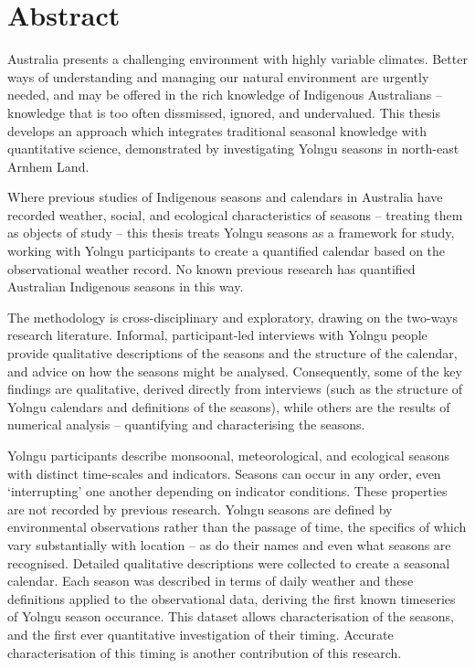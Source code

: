 \chapter{Abstract}

Australia presents a challenging environment with highly variable climates.
Better ways of understanding and managing our natural environment are urgently needed, and
may be offered in the rich knowledge of Indigenous Australians -- knowledge that
is too often dissmissed, ignored, and undervalued.
%
This thesis develops an approach which integrates traditional seasonal knowledge
with quantitative science, demonstrated by investigating Yolngu
seasons in north-east Arnhem Land.

Where previous studies of Indigenous seasons and calendars in Australia have
recorded weather, social, and ecological characteristics of seasons -- treating
them as objects of study -- this thesis treats Yolngu seasons as a framework
for study, working with Yolngu participants to create a quantified calendar
based on the observational weather record.  No known previous research has quantified
Australian Indigenous seasons in this way.


The methodology is cross-disciplinary and exploratory, drawing on the two-ways
research literature.  Informal, participant-led interviews with Yolngu people
provide qualitative descriptions of the seasons and the structure of the
calendar, and advice on how the seasons might be analysed.
%
Consequently, some of the key findings are qualitative, derived directly from
interviews (such as the structure of Yolngu calendars and definitions of the
seasons), while others are the results of numerical analysis -- quantifying
and characterising the seasons.


Yolngu participants describe monsoonal, meteorological, and ecological
seasons with distinct time-scales and indicators.  Seasons can occur in any
order, even `interrupting' one another depending on indicator conditions.
These properties are not recorded by previous research.
%
Yolngu seasons are defined by environmental observations rather than the
passage of time, the specifics of which vary substantially with location --
as do their names and even what seasons are recognised.  Detailed qualitative
descriptions were collected to create a seasonal calendar.
%
Each season was described in terms of daily weather and these definitions
applied to the observational data, deriving the first known timeseries of Yolngu
season occurance.  This dataset allows characterisation of the seasons,
and the first ever quantitative investigation of their timing.  Accurate
characterisation of this timing is another contribution of this research.

